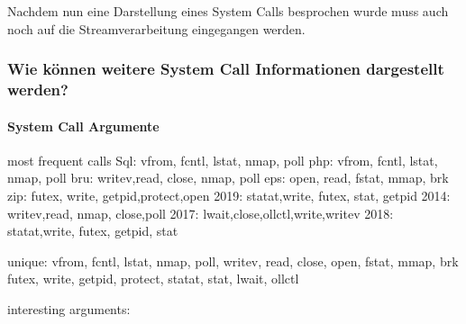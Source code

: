             Nachdem nun eine Darstellung eines System Calls besprochen wurde muss auch noch auf die Streamverarbeitung eingegangen werden.

            \subsubsection{Wie können weitere System Call Informationen dargestellt werden?}\label{sec:Meta}

            \paragraph{System Call Argumente}  
                most frequent calls
                Sql: vfrom, fcntl, lstat, nmap, poll
                php: vfrom, fcntl, lstat, nmap, poll
                bru: writev,read,  close, nmap, poll
                eps: open,  read,  fstat, mmap, brk
                zip: futex, write, getpid,protect,open
                2019: statat,write, futex, stat, getpid
                2014: writev,read,  nmap,  close,poll
                2017: lwait,close,ollctl,write,writev
                2018: statat,write, futex, getpid, stat


                unique:
                    vfrom, fcntl, lstat, nmap, poll, writev, read, close, open, fstat, mmap, brk
                    futex, write, getpid, protect, statat, stat, lwait, ollctl

            interesting arguments:
            
